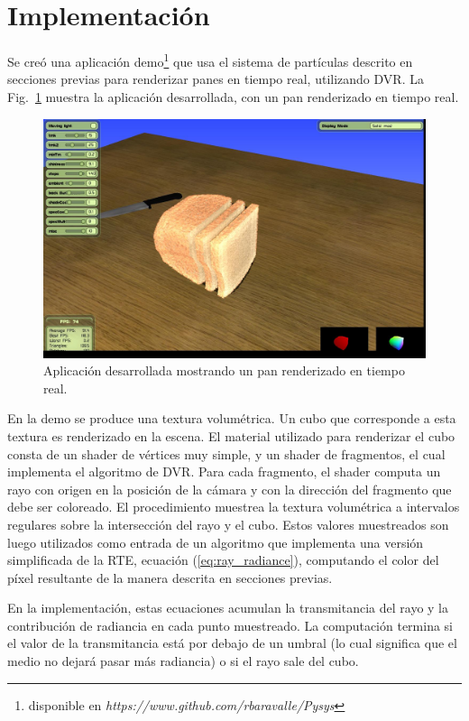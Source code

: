 \section{Implementación}

Se creó una aplicación demo\footnote{disponible en \emph{https://www.github.com/rbaravalle/Pysys}}  que usa el sistema de partículas descrito en secciones previas para renderizar panes en tiempo real, utilizando DVR.
La Fig.~\ref{fg:application} muestra la aplicación desarrollada, con un pan renderizado en tiempo real.


\begin{figure}
\centerline{\includegraphics[width=13cm]{figures/application}}
\caption{Aplicación desarrollada mostrando un pan renderizado en tiempo real.}
\label{fg:application}
\end{figure}


En la demo se produce una textura volumétrica.
Un cubo que corresponde a esta textura es renderizado en la escena.
El material utilizado para renderizar el cubo consta de un shader de vértices muy simple, y un shader de fragmentos, el cual implementa el algoritmo de DVR.
Para cada fragmento, el shader computa un rayo con origen en la posición de la cámara y con la dirección del fragmento que debe ser coloreado.
El procedimiento muestrea la textura volumétrica a intervalos regulares sobre la intersección del rayo y el cubo.
Estos valores muestreados son luego utilizados como entrada de un algoritmo que implementa una versión simplificada de la RTE, ecuación (\ref{eq:ray_radiance}), computando el color del píxel resultante de la manera descrita en secciones previas.

En la implementación, estas ecuaciones acumulan la transmitancia del rayo y la contribución de radiancia en cada punto muestreado.
La computación termina si el valor de la transmitancia está por debajo de un umbral (lo cual significa que el medio no dejará pasar más radiancia) o si el rayo sale del cubo.

